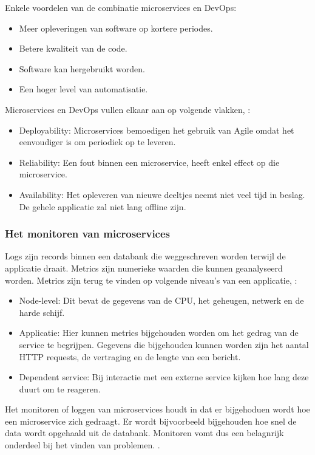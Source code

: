 Enkele voordelen van de combinatie microservices en DevOps:
\begin{itemize}
	\item Meer opleveringen van software op kortere periodes.
	\item Betere kwaliteit van de code.
	\item Software kan hergebruikt worden.
	\item Een hoger level van automatisatie.
\end{itemize}

Microservices en DevOps vullen elkaar aan op volgende vlakken, \textcite{Mulesoft2019}:
\begin{itemize}
	\item Deployability: Microservices bemoedigen het gebruik van Agile omdat het eenvoudiger is om periodiek op te leveren. 
	\item Reliability: Een fout binnen een microservice, heeft enkel effect op die microservice. 
	\item Availability: Het opleveren van nieuwe  deeltjes neemt niet veel tijd in beslag. De gehele applicatie zal niet lang offline zijn.
\end{itemize}




\subsubsection{Het monitoren van microservices}
Logs zijn records binnen een databank die weggeschreven worden terwijl de applicatie draait. Metrics zijn numerieke waarden die kunnen geanalyseerd worden. Metrics zijn terug te vinden op volgende niveau's van een applicatie, \textcite{Wasson2018}:
\begin{itemize}
	\item Node-level: Dit bevat de gegevens van de CPU, het geheugen, netwerk en de harde schijf. 
	\item Applicatie: Hier kunnen metrics bijgehouden worden om het gedrag van de service te begrijpen. Gegevens die bijgehouden kunnen worden zijn het aantal HTTP requests, de vertraging en de lengte van een bericht.
	\item Dependent service: Bij interactie met een externe service kijken hoe lang deze duurt om te reageren. 
\end{itemize}


Het monitoren of loggen van microservices houdt in dat er bijgehoduen wordt hoe een microservice zich gedraagt. Er wordt bijvoorbeeld bijgehouden hoe snel de data wordt opgehaald uit de databank. Monitoren vomt dus een belagnrijk onderdeel bij het vinden van problemen. \textcite{Ananthasubramanian2018}.



